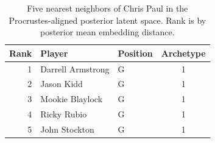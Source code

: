 \begin{table}[htbp]
  \centering\small
  \begin{tabular}{rllc}
    \toprule
    Rank & Player & Position & Archetype \\
    \midrule
    1 & Darrell Armstrong & G & 1 \\
    2 & Jason Kidd & G & 1 \\
    3 & Mookie Blaylock & G & 1 \\
    4 & Ricky Rubio & G & 1 \\
    5 & John Stockton & G & 1 \\
    \bottomrule
  \end{tabular}
  \caption{Five nearest neighbors of Chris Paul in the Procrustes-aligned posterior latent space. Rank is by posterior mean embedding distance.}
  \label{tab:Chris_Paul_neighbors}
\end{table}

